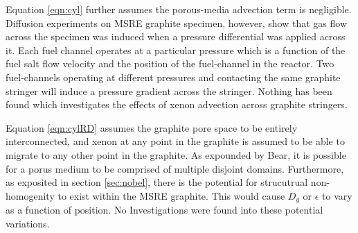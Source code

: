 Equation \ref{eqn:cyl} further assumes the porous-media advection term is negligible. Diffusion experiments on MSRE graphite specimen, however, show that gas flow across the specimen was induced when a pressure differential was applied across it.\cite[p. 26]{ORNL4148} Each fuel channel operates at a particular pressure which is a function of the fuel salt flow velocity and the position of the fuel-channel in the reactor.\cite[p. 14]{ORNLTM378}  Two fuel-channels operating at different pressures and contacting the same graphite stringer will induce a pressure gradient across the stringer.  Nothing has been found which investigates the effects of xenon advection across graphite stringers.

Equation \ref{eqn:cylRD} assumes the graphite pore space to be entirely interconnected, and xenon at any point in the graphite is assumed to be able to migrate to any other point in the graphite.  As expounded by Bear, it is possible for a porus medium to be comprised of multiple disjoint domains. \cite[p. 7]{Bear2012} Furthermore, as exposited in section \ref{sec:nobel}, there is the potential for strucutrual non-homogenity to exist within the MSRE graphite. This would cause $D_g$ or $\epsilon$ to vary as a function of position.  No Investigations were found into these potential variations.